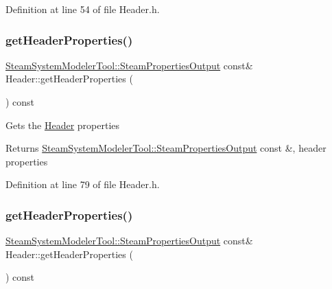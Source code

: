 Definition at line 54 of file Header.\+h.

\mbox{\label{class_header_a0d27b0e1b3c16cc24b4ba6f64abb7cb0}} 
\subsubsection{\texorpdfstring{get\+Header\+Properties()}{getHeaderProperties()}\hspace{0.1cm}{\footnotesize\ttfamily [1/3]}}
{\footnotesize\ttfamily \hyperlink{struct_steam_system_modeler_tool_1_1_steam_properties_output}{Steam\+System\+Modeler\+Tool\+::\+Steam\+Properties\+Output} const\& Header\+::get\+Header\+Properties (\begin{DoxyParamCaption}{ }\end{DoxyParamCaption}) const\hspace{0.3cm}{\ttfamily [inline]}}

Gets the \hyperlink{class_header}{Header} properties \begin{DoxyReturn}{Returns}
\hyperlink{struct_steam_system_modeler_tool_1_1_steam_properties_output}{Steam\+System\+Modeler\+Tool\+::\+Steam\+Properties\+Output} const \&, header properties 
\end{DoxyReturn}


Definition at line 79 of file Header.\+h.

\mbox{\label{class_header_a0d27b0e1b3c16cc24b4ba6f64abb7cb0}} 
\subsubsection{\texorpdfstring{get\+Header\+Properties()}{getHeaderProperties()}\hspace{0.1cm}{\footnotesize\ttfamily [2/3]}}
{\footnotesize\ttfamily \hyperlink{struct_steam_system_modeler_tool_1_1_steam_properties_output}{Steam\+System\+Modeler\+Tool\+::\+Steam\+Properties\+Output} const\& Header\+::get\+Header\+Properties (\begin{DoxyParamCaption}{ }\end{DoxyParamCaption}) const\hspace{0.3cm}{\ttfamily [inline]}}

